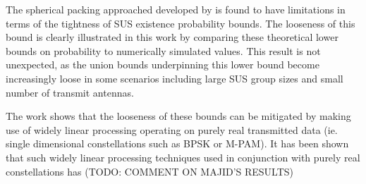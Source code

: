 The spherical packing approached developed by \cite{Swannack2005} is found to have limitations in terms of the tightness of SUS existence probability bounds. The looseness of this bound is clearly illustrated in this work by comparing these theoretical lower bounds on probability to numerically simulated values. This result is not unexpected, as the union bounds underpinning this lower bound become increasingly loose in some scenarios including large SUS group sizes and small number of transmit antennas.

The work shows that the looseness of these bounds can be mitigated by making use of widely linear processing operating on purely real transmitted data (ie. single dimensional constellations such as BPSK or M-PAM). It has been shown that such widely linear processing techniques used in conjunction with purely real constellations has (TODO: COMMENT ON MAJID'S RESULTS)